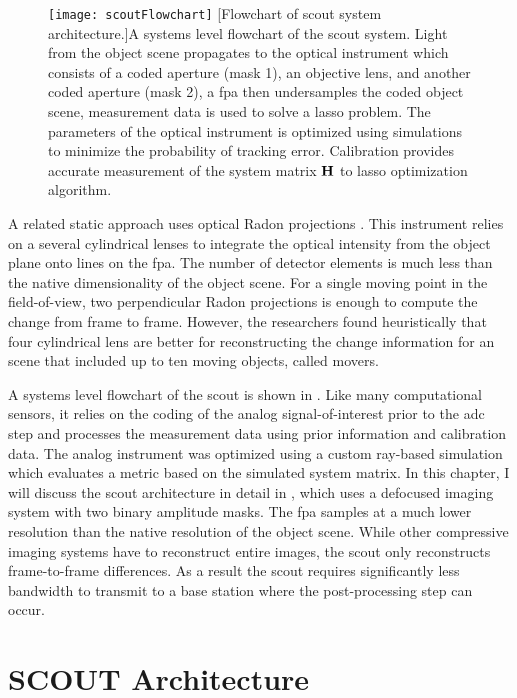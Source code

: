 \begin{figure}
	\centering
	\texttt{[image: scoutFlowchart]}
	[Flowchart of \gls{scout} system architecture.]{A systems level flowchart of the \gls{scout} system. Light from the object scene propagates to the optical instrument which consists of a coded aperture (mask 1), an objective lens, and another coded aperture (mask 2), a \acrfull{fpa} then undersamples the coded object scene, measurement data is used to solve a \gls{lasso} problem. The parameters of the optical instrument is optimized using simulations to minimize the probability of tracking error. Calibration provides accurate measurement of the system matrix $\displaystyle \mathbf{H}$ to lasso optimization algorithm.}
	\label{fig:scoutFlowChart}
\end{figure}

A related static approach uses optical Radon projections \cite{kashter2012optical}. This instrument relies on a several cylindrical lenses to integrate the optical intensity from the object plane onto lines on the \gls{fpa}. The number of detector elements is much less than the native dimensionality of the object scene. For a single moving point in the field-of-view, two perpendicular Radon projections is enough to compute the change from frame to frame. However, the researchers found heuristically that four cylindrical lens are better for reconstructing the change information for an scene that included up to ten moving objects, called movers. 

A systems level flowchart of the \gls{scout} is shown in . Like many computational sensors, it relies on the coding of the analog signal-of-interest prior to the \gls{adc} step and processes the measurement data using prior information and calibration data. The analog instrument was optimized using a custom ray-based simulation which evaluates a metric based on the simulated system matrix. In this chapter, I will discuss the \gls{scout} architecture in detail in , which uses a defocused imaging system with two binary amplitude masks. The \gls{fpa} samples at a much lower resolution than the native resolution of the object scene. While other compressive imaging systems have to reconstruct entire images, the \gls{scout} only reconstructs frame-to-frame differences. As a result the \gls{scout} requires significantly less bandwidth to transmit to a base station where the post-processing step can occur.


\section{SCOUT Architecture}\label{sec:ScoutArchitecture}

